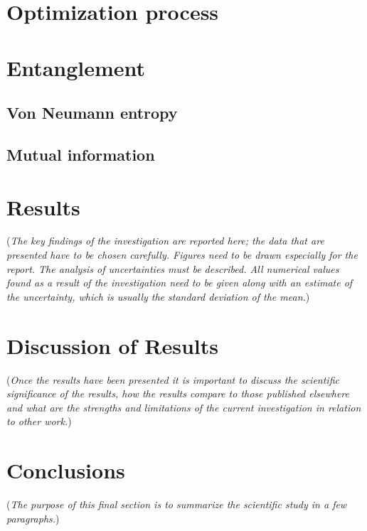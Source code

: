 \documentclass{physics_article_B}
\begin{document}

\section{Optimization process} %
\label{sec:optimization_process}


\section{Entanglement} %
\label{sec:entanglement}
\subsection{Von Neumann entropy} %
\label{sub:von_neumann_entropy}

\subsection{Mutual information} %
\label{sub:mutual_information}


\section{Results\label{results}}
(\emph{The key findings of the investigation are reported here; the data that are presented have to be chosen carefully. Figures need to be drawn especially for the report. The analysis of uncertainties must be described. All numerical values found as a result of the investigation need to be given along with an estimate of the uncertainty, which is usually the standard deviation of the mean.})

\section{Discussion of Results\label{results}}
(\emph{Once the results have been presented it is important to discuss the scientific significance of the results, how the results compare to those published elsewhere and what are the strengths and limitations of the current investigation in relation to other work.})

\section{Conclusions\label{conclusions}}
(\emph{The purpose of this final section is to summarize the scientific study in a few paragraphs.})

\newpage
{}
\appendix
\section{\label{}}



\end{document}
